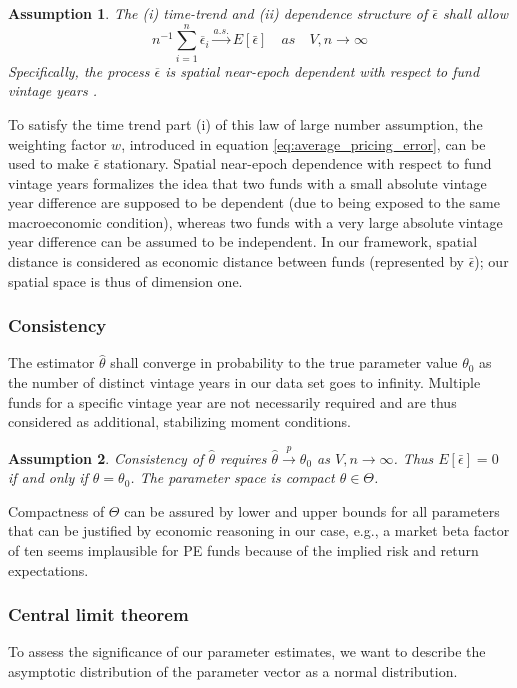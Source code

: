 \documentclass[12pt]{article}
\newtheorem{assume}{Assumption}
\begin{document}
\begin{assume}
	The (i) time-trend and (ii) dependence structure of $\bar{\epsilon}$ shall allow
	\[
	n^{-1} \sum_{i=1}^n \overline{\epsilon}_i \overset{a.s.}\to E[\bar{\epsilon}]
	\quad {as} \quad V,n \to \infty
	\]
	Specifically, the process $\overline{\epsilon}$ is spatial near-epoch dependent with respect to fund vintage years \citep{JP12}.
\end{assume}
To satisfy the time trend part (i) of this law of large number assumption, the weighting factor $w$, introduced in equation \ref{eq:average_pricing_error}, can be used to make $\bar{\epsilon}$ stationary.
Spatial near-epoch dependence with respect to fund vintage years formalizes the idea that two funds with a small absolute vintage year difference are supposed to be dependent (due to being exposed to the same macroeconomic condition), whereas two funds with a very large absolute vintage year difference can be assumed to be independent.
In our framework, spatial distance is considered as economic distance between funds (represented by $\bar{\epsilon}$); our spatial space is thus of dimension one.

\subsubsection{Consistency}
The estimator $\hat{\theta}$ shall converge in probability to the true parameter value $\theta_0$ as the number of distinct vintage years in our data set goes to infinity.
Multiple funds for a specific vintage year are not necessarily required and are thus considered as additional, stabilizing moment conditions.

\begin{assume}
 Consistency of $\hat{\theta}$ requires $\hat{\theta} \overset{p}{\to} \theta_0$ as $V,n \to \infty$.
 Thus $E[\bar{\epsilon}]=0$ if and only if $\theta=\theta_0$.
 The parameter space is compact $\theta \in \Theta$.
\end{assume}
Compactness of $\Theta$ can be assured by lower and upper bounds for all parameters that can be justified by economic reasoning in our case, e.g., a market beta factor of ten seems implausible for PE funds because of the implied risk and return expectations.

\subsubsection{Central limit theorem}
To assess the significance of our parameter estimates, we want to describe the asymptotic distribution of the parameter vector as a normal distribution.
\end{document}
